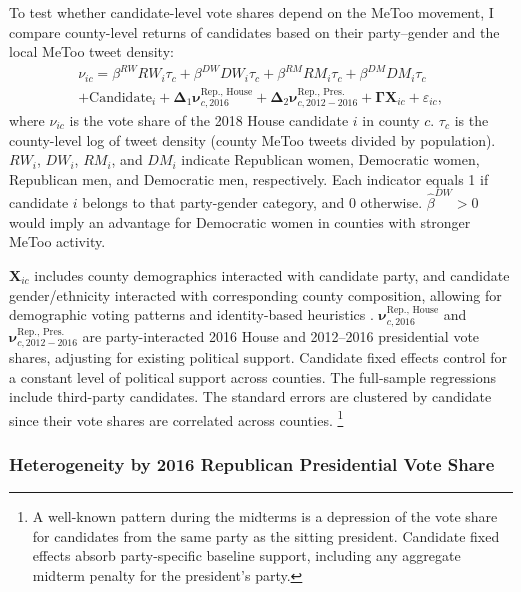 \documentclass[manuscript,screen,nonacm,11pt,acm]{acmart}
\begin{document}
To test whether candidate-level vote shares depend on the MeToo movement, I compare county-level returns of candidates based on their party--gender and the local MeToo tweet density:
\begin{multline}
\label{eq:voteshare}
\nu_{ic} = 
\beta^{RW} RW_i \tau_c + 
\beta^{DW} DW_i \tau_c + 
\beta^{RM} RM_i \tau_c + 
\beta^{DM} DM_i \tau_c\\ 
+ \text{Candidate}_i + 
\bm{\Delta}_1  \bm{\nu}^{\text{Rep., House}}_{c, 2016}  + 
\bm{\Delta}_2  \bm{\nu}^{\text{Rep., Pres.}}_{c, 2012-2016} + 
\bm{\Gamma} \bm{X}_{ic} + 
\varepsilon_{ic},
\end{multline}
where $\nu_{ic}$ is the vote share of the 2018 House candidate $i$ in county $c$.
$\tau_c$ is the county-level log of tweet density (county MeToo tweets divided by population).
$RW_i$, $DW_i$, $RM_i$, and $DM_i$ indicate Republican women, Democratic women, Republican men, and Democratic men, respectively.
Each indicator equals 1 if candidate $i$ belongs to that party-gender category, and 0 otherwise.
$\hat{\beta}^{DW} > 0$ would imply an advantage for Democratic women in counties with stronger MeToo activity.

$\bm{X}_{ic}$ includes county demographics interacted with candidate party, and candidate gender/ethnicity interacted with corresponding county composition, allowing for demographic voting patterns and identity-based heuristics \citep{EdlundPande2002, Abrajano2005, Herron2005, HOLLI2010, Oswald2010, Stephens-Davidowitz2014, Flanagan2018}.
$\bm{\nu}^{\text{Rep., House}}_{c, 2016}$ and $\bm{\nu}^{\text{Rep., Pres.}}_{c, 2012-2016}$ are party-interacted 2016 House and 2012--2016 presidential vote shares, adjusting for existing political support.
Candidate fixed effects control for a constant level of political support across counties.
The full-sample regressions include third-party candidates.
The standard errors are clustered by candidate since their vote shares are correlated across counties.%
\footnote{A well-known pattern during the midterms is a depression of the vote share for candidates from the same party as the sitting president.
	Candidate fixed effects absorb party-specific baseline support, including any aggregate midterm penalty for the president's party.}

\subsubsection{Heterogeneity by 2016 Republican Presidential Vote Share}
\end{document}
